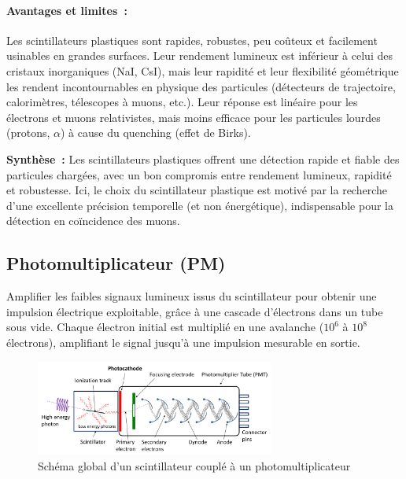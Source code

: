 \documentclass[a4paper,12pt,twoside]{article}
\begin{document}
\paragraph{Avantages et limites~:} Les scintillateurs plastiques sont rapides, robustes, peu coûteux et facilement usinables en grandes surfaces. Leur rendement lumineux est inférieur à celui des cristaux inorganiques (NaI, CsI), mais leur rapidité et leur flexibilité géométrique les rendent incontournables en physique des particules (détecteurs de trajectoire, calorimètres, télescopes à muons, etc.). Leur réponse est linéaire pour les électrons et muons relativistes, mais moins efficace pour les particules lourdes (protons, $\alpha$) à cause du quenching (effet de Birks).


\begin{remarque}
\textbf{Synthèse~:} Les scintillateurs plastiques offrent une détection rapide et fiable des particules chargées, avec un bon compromis entre rendement lumineux, rapidité et robustesse. Ici, le choix du scintillateur plastique est motivé par la recherche d’une excellente précision temporelle (et non énergétique), indispensable pour la détection en coïncidence des muons.
\end{remarque}



\subsection{Photomultiplicateur (PM)}


\vspace{1em}
\begin{center}
\begin{tcolorbox}[colback=blue!5!white, colframe=blue!60!black, title=Principe du photomultiplicateur (PM)]
Amplifier les faibles signaux lumineux issus du scintillateur pour obtenir une impulsion électrique exploitable, grâce à une cascade d’électrons dans un tube sous vide. Chaque électron initial est multiplié en une avalanche ($10^6$ à $10^8$ électrons), amplifiant le signal jusqu’à une impulsion mesurable en sortie.

\end{tcolorbox}
\end{center}


\begin{figure}[H]
  \centering
  \includegraphics[width=0.7\textwidth]{Images/PhotoMultiplierTubeAndScintillator.png}
  \caption{Schéma global d’un scintillateur couplé à un photomultiplicateur}
  \label{fig:pm_scintillator}
\end{figure}
\end{document}
